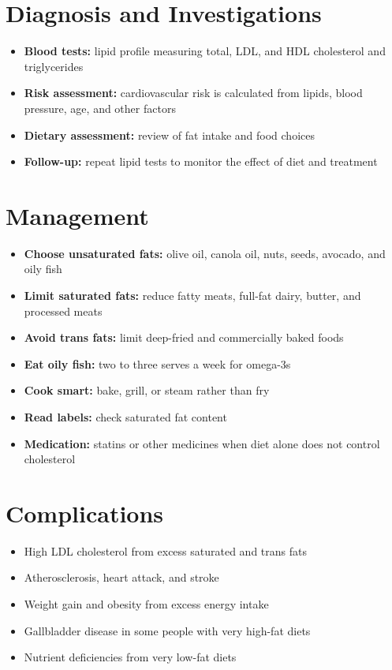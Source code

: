 \section*{Diagnosis and Investigations}
\begin{itemize}
    \item \textbf{Blood tests:} lipid profile measuring total, LDL, and HDL cholesterol and triglycerides
    \item \textbf{Risk assessment:} cardiovascular risk is calculated from lipids, blood pressure, age, and other factors
    \item \textbf{Dietary assessment:} review of fat intake and food choices
    \item \textbf{Follow-up:} repeat lipid tests to monitor the effect of diet and treatment
\end{itemize}

\section*{Management}
\begin{itemize}
    \item \textbf{Choose unsaturated fats:} olive oil, canola oil, nuts, seeds, avocado, and oily fish
    \item \textbf{Limit saturated fats:} reduce fatty meats, full-fat dairy, butter, and processed meats
    \item \textbf{Avoid trans fats:} limit deep-fried and commercially baked foods
    \item \textbf{Eat oily fish:} two to three serves a week for omega-3s
    \item \textbf{Cook smart:} bake, grill, or steam rather than fry
    \item \textbf{Read labels:} check saturated fat content
    \item \textbf{Medication:} statins or other medicines when diet alone does not control cholesterol
\end{itemize}

\section*{Complications}
\begin{itemize}
    \item High LDL cholesterol from excess saturated and trans fats
    \item Atherosclerosis, heart attack, and stroke
    \item Weight gain and obesity from excess energy intake
    \item Gallbladder disease in some people with very high-fat diets
    \item Nutrient deficiencies from very low-fat diets
\end{itemize}

